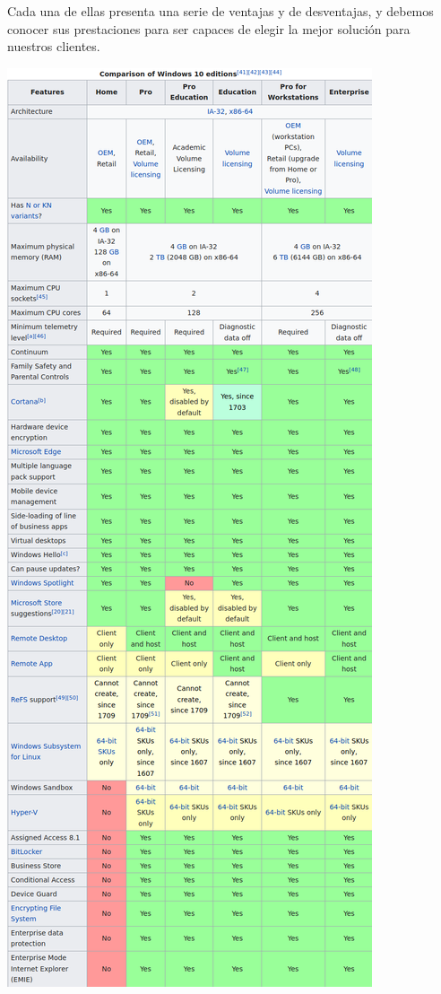 \documentclass[11pt]{article}
\begin{document}
Cada una de ellas presenta una serie de ventajas y de desventajas, y debemos conocer 
sus prestaciones para ser capaces de elegir la mejor solución para nuestros clientes.

\begin{center}
\includegraphics[width=.9\linewidth]{./imgs/ediciones-win10-01.png}
\end{center}
\end{document}
